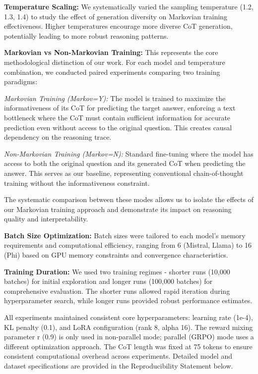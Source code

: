 \documentclass{article}
\begin{document}
\textbf{Temperature Scaling:} We systematically varied the sampling temperature (1.2, 1.3, 1.4) to study the effect of generation diversity on Markovian training effectiveness. Higher temperatures encourage more diverse CoT generation, potentially leading to more robust reasoning patterns.

\textbf{Markovian vs Non-Markovian Training:} This represents the core methodological distinction of our work. For each model and temperature combination, we conducted paired experiments comparing two training paradigms:

\textit{Markovian Training (Markov=Y):} The model is trained to maximize the informativeness of its CoT for predicting the target answer, enforcing a text bottleneck where the CoT must contain sufficient information for accurate prediction even without access to the original question. This creates causal dependency on the reasoning trace.

\textit{Non-Markovian Training (Markov=N):} Standard fine-tuning where the model has access to both the original question and its generated CoT when predicting the answer. This serves as our baseline, representing conventional chain-of-thought training without the informativeness constraint.

The systematic comparison between these modes allows us to isolate the effects of our Markovian training approach and demonstrate its impact on reasoning quality and interpretability.

\textbf{Batch Size Optimization:} Batch sizes were tailored to each model's memory requirements and computational efficiency, ranging from 6 (Mistral, Llama) to 16 (Phi) based on GPU memory constraints and convergence characteristics.

\textbf{Training Duration:} We used two training regimes - shorter runs (10,000 batches) for initial exploration and longer runs (100,000 batches) for comprehensive evaluation. The shorter runs allowed rapid iteration during hyperparameter search, while longer runs provided robust performance estimates.

All experiments maintained consistent core hyperparameters: learning rate (1e-4), KL penalty (0.1), and LoRA configuration (rank 8, alpha 16). The reward mixing parameter r (0.9) is only used in non-parallel mode; parallel (GRPO) mode uses a different optimization approach. The CoT length was fixed at 75 tokens to ensure consistent computational overhead across experiments. Detailed model and dataset specifications are provided in the Reproducibility Statement below.
\end{document}
